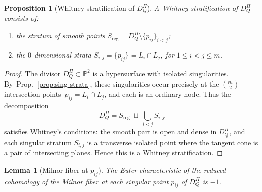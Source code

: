 \documentclass{article}
\newtheorem{proposition}{Proposition}
\newtheorem{lemma}{Lemma}
\newcommand{\PP}{\mathbb{P}}
\begin{document}
\begin{proposition}[Whitney stratification of $D_Q^\Pi$]
\label{prop:Whitney-plane}
A Whitney stratification of $D_Q^\Pi$ consists of:
\begin{enumerate}
\item the stratum of smooth points $S_{\mathrm{reg}} = D_Q^\Pi \setminus \{p_{ij}\}_{i<j}$;
\item the $0$-dimensional strata $S_{i,j} = \{p_{ij}\} = L_i \cap L_j$, for $1\le i<j\le m$.
\end{enumerate}
\end{proposition}

\begin{proof}
The divisor $D_Q^\Pi \subset \PP^2$ is a hypersurface with isolated singularities.  
By~Prop.~\ref{prop:sing-strata}, these singularities occur precisely at the $\binom{m}{2}$ intersection points~\mbox{$p_{ij}=L_i\cap L_j$}, and each is an ordinary node.  
Thus the decomposition
\[
D_Q^\Pi = S_{\mathrm{reg}} \ \sqcup\ \bigcup_{i<j} S_{i,j}
\]
satisfies Whitney’s conditions: the smooth part is open and dense in $D_Q^\Pi$, and each singular stratum $S_{i,j}$ is a transverse isolated point where the tangent cone is a pair of intersecting planes.  
Hence this is a Whitney stratification.
\end{proof}

\begin{lemma}[Milnor fiber at $p_{ij}$]
\label{lem:Milnor-node}
The Euler characteristic of the reduced cohomology of the Milnor fiber at each singular point
$p_{ij}$ of $D_Q^\Pi$ is $-1$.
\end{lemma}
\end{document}
